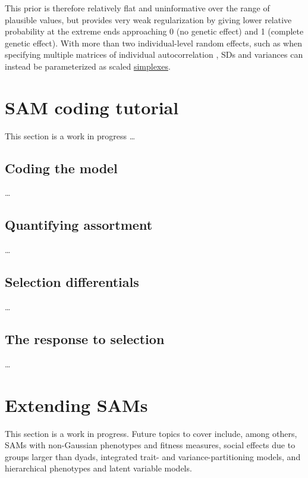 \documentclass[
]{book}
\begin{document}
This prior is therefore relatively flat and uninformative over the range of plausible values, but provides very weak regularization by giving lower relative probability at the extreme ends approaching 0 (no genetic effect) and 1 (complete genetic effect). With more than two individual-level random effects, such as when specifying multiple matrices of individual autocorrelation \citep{Thomson2018}, SDs and variances can instead be parameterized as scaled \href{https://mc-stan.org/docs/2_19/reference-manual/vector-and-matrix-data-types.html}{simplexes}.

\hypertarget{sam-coding-tutorial}{%
\chapter{SAM coding tutorial}\label{sam-coding-tutorial}}

This section is a work in progress \ldots{}

\hypertarget{coding-the-model}{%
\section{Coding the model}\label{coding-the-model}}

\ldots{}

\hypertarget{quantifying-assortment}{%
\section{Quantifying assortment}\label{quantifying-assortment}}

\ldots{}

\hypertarget{selection-differentials}{%
\section{Selection differentials}\label{selection-differentials}}

\ldots{}

\hypertarget{the-response-to-selection}{%
\section{The response to selection}\label{the-response-to-selection}}

\ldots{}

\hypertarget{extending-sams}{%
\chapter{Extending SAMs}\label{extending-sams}}

This section is a work in progress. Future topics to cover include, among others, SAMs with non-Gaussian phenotypes and fitness measures, social effects due to groups larger than dyads, integrated trait- and variance-partitioning models, and hierarchical phenotypes and latent variable models.

  
\end{document}
